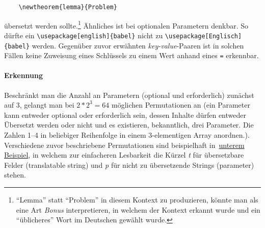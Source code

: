 \begin{Verbatim}
    \newtheorem{lemma}{Problem}
\end{Verbatim}
übersetzt werden sollte.\footnote{\enquote{Lemma} statt \enquote{Problem} in diesem Kontext zu produzieren, könnte man als eine Art \textit{Bonus} interpretieren, in welchem der Kontext erkannt wurde und ein \enquote{üblicheres} Wort im Deutschen gewählt wurde.}%
Ähnliches ist bei optionalen Parametern denkbar. So dürfte ein \verb"\usepackage[english]{babel}" nicht zu \verb"\usepackage[Englisch]{babel}" werden. Gegenüber zuvor erwähnten \textit{key-value}-Paaren ist in solchen Fällen keine Zuweisung eines Schlüssels zu einem Wert anhand eines \verb-=- erkennbar.


\paragraph{Erkennung}
Beschränkt man die Anzahl an Parametern (optional und erforderlich) zunächst auf 3, gelangt man bei ${2*2}^{3}=64$ möglichen Permutationen an (ein Parameter kann entweder optional oder erforderlich sein, dessen Inhalte dürfen entweder Übersetzt werden oder nicht und es existieren, bekanntlich, drei Parameter. Die Zahlen 1--4 in beliebiger Reihenfolge in einem 3-elementigen Array anordnen.). 
Verschiedene zuvor beschriebene Permutationen sind beispielhaft in~\hyperref[tab:problems:exampleParameter]{unterem Beispiel}, in welchem zur einfacheren Lesbarkeit die Kürzel \textit{t} für übersetzbare Felder (translatable string) und \textit{p} für nicht zu übersetzende Strings (parameter) stehen.


